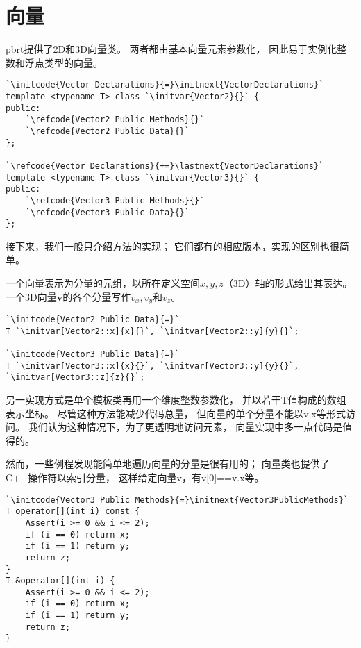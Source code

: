 \section{向量}\label{sec:向量}

pbrt提供了2D和3D向量类。
两者都由基本向量元素参数化，
因此易于实例化整数和浮点类型的向量。

\begin{lstlisting}
`\initcode{Vector Declarations}{=}\initnext{VectorDeclarations}`
template <typename T> class `\initvar{Vector2}{}` {
public:
    `\refcode{Vector2 Public Methods}{}`
    `\refcode{Vector2 Public Data}{}`
};

`\refcode{Vector Declarations}{+=}\lastnext{VectorDeclarations}`
template <typename T> class `\initvar{Vector3}{}` {
public:
    `\refcode{Vector3 Public Methods}{}`
    `\refcode{Vector3 Public Data}{}`
};
\end{lstlisting}

接下来，我们一般只介绍方法的实现；
它们都有的相应版本，实现的区别也很简单。

一个向量表示为分量的元组，以所在定义空间$x,y,z$（3D）轴的形式给出其表达。
一个3D向量$\bm v$的各个分量写作$v_x,v_y$和$v_z$。

\begin{lstlisting}
`\initcode{Vector2 Public Data}{=}`
T `\initvar[Vector2::x]{x}{}`, `\initvar[Vector2::y]{y}{}`;

`\initcode{Vector3 Public Data}{=}`
T `\initvar[Vector3::x]{x}{}`, `\initvar[Vector3::y]{y}{}`, `\initvar[Vector3::z]{z}{}`;
\end{lstlisting}

另一实现方式是单个模板类再用一个维度整数参数化，
并以若干{\ttfamily T}值构成的数组表示坐标。
尽管这种方法能减少代码总量，
但向量的单个分量不能以{\ttfamily v.x}等形式访问。
我们认为这种情况下，为了更透明地访问元素，
向量实现中多一点代码是值得的。

然而，一些例程发现能简单地遍历向量的分量是很有用的；
向量类也提供了C++操作符以索引分量，
这样给定向量{\ttfamily v}，有{\ttfamily v[0]==v.x}等。
\begin{lstlisting}
`\initcode{Vector3 Public Methods}{=}\initnext{Vector3PublicMethods}`
T operator[](int i) const { 
    Assert(i >= 0 && i <= 2);
    if (i == 0) return x;
    if (i == 1) return y;
    return z;
}
T &operator[](int i) { 
    Assert(i >= 0 && i <= 2);
    if (i == 0) return x;
    if (i == 1) return y;
    return z;
}
\end{lstlisting}

